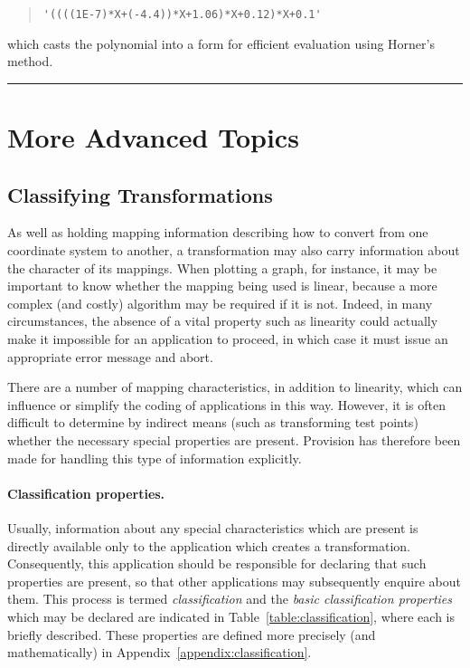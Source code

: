 \documentclass[twoside,11pt]{article}
\newcommand{\xlabel}[1]{}
\renewcommand{\_}{\texttt{\symbol{95}}}
\newcommand{\exampledone}[0]{\begin{center} \rule{6em}{0.2mm} \end{center}}
\begin{document}
\begin{quote}
\begin{verbatim}
'((((1E-7)*X+(-4.4))*X+1.06)*X+0.12)*X+0.1'
\end{verbatim}
\end{quote}

which casts the polynomial into a form for efficient evaluation using
Horner's method.
\exampledone


\section{\xlabel{more_advanced_topics}More Advanced Topics}


\subsection{\xlabel{classifying_transformations}Classifying Transformations}

\label{section:advanced:classification}

As well as holding mapping information describing how to convert from one
coordinate system to another, a transformation may also carry information
about the character of its mappings.
When plotting a graph, for instance, it may be important to know whether the
mapping being used is linear, because a more complex (and costly) algorithm
may be required if it is not.
Indeed, in many circumstances, the absence of a vital property such as
linearity could actually make it impossible for an application to proceed,
in which case it must issue an appropriate error message and abort.

There are a number of mapping characteristics, in addition to linearity,
which can influence or simplify the coding of applications in this way.
However, it is often difficult to determine by indirect means (such as
transforming test points) whether the necessary special properties are
present.
Provision has therefore been made for handling this type of information
explicitly.

\paragraph{Classification properties.}
Usually, information about any special characteristics which are present is
directly available only to the application which creates a transformation.
Consequently, this application should be responsible for declaring that such
properties are present, so that other applications may subsequently enquire
about them.
This process is termed \emph{classification} and the \emph{basic classification
properties} which may be declared are indicated in
Table~\ref{table:classification}, where each is briefly described.
These properties are defined more precisely (and mathematically) in
Appendix~\ref{appendix:classification}.
\end{document}
